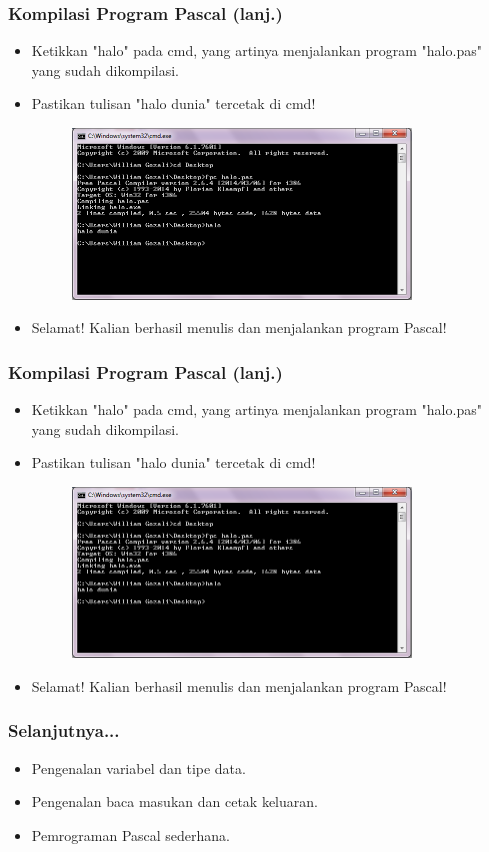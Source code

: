 \documentclass{beamer}
\begin{document}
\begin{frame}
\frametitle{Kompilasi Program Pascal (lanj.)}
\begin{itemize}
	\item Ketikkan "halo" pada cmd, yang artinya menjalankan program "halo.pas" yang sudah dikompilasi.
	\item Pastikan tulisan "halo dunia" tercetak di cmd!
	\begin{figure}
		\includegraphics[width=9cm]{asset/hello_4.PNG}
	\end{figure}
	\item Selamat! Kalian berhasil menulis dan menjalankan program Pascal!
\end{itemize}
\end{frame}

\begin{frame}
\frametitle{Kompilasi Program Pascal (lanj.)}
\begin{itemize}
	\item Ketikkan "halo" pada cmd, yang artinya menjalankan program "halo.pas" yang sudah dikompilasi.
	\item Pastikan tulisan "halo dunia" tercetak di cmd!
	\begin{figure}
		\includegraphics[width=9cm]{asset/hello_4.PNG}
	\end{figure}
	\item Selamat! Kalian berhasil menulis dan menjalankan program Pascal!
\end{itemize}
\end{frame}

\begin{frame}
\frametitle{Selanjutnya...}
\begin{itemize}
	\item Pengenalan variabel dan tipe data.
	\item Pengenalan baca masukan dan cetak keluaran.
	\item Pemrograman Pascal sederhana.
\end{itemize}
\end{frame}
\end{document}
